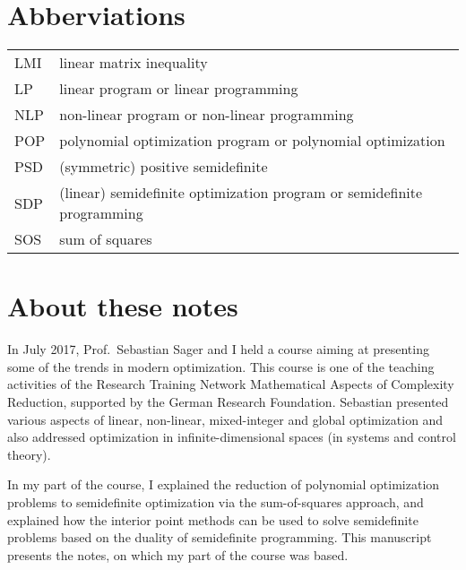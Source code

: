 \clearpage 

\section*{Abberviations}

\begin{tabular}{ll}
	LMI & linear matrix inequality 
	\\ LP & linear program or linear programming 
	\\ NLP & non-linear program or non-linear programming 
	\\ POP & polynomial optimization program or polynomial optimization
	\\ PSD & (symmetric) positive semidefinite
	\\ SDP & (linear) semidefinite optimization program or semidefinite programming
	\\ SOS & sum of squares
\end{tabular}

\clearpage 

\section*{About these notes} 

In July 2017, Prof.~Sebastian Sager and I held a course aiming at presenting some of the trends in modern optimization. This course is one of the teaching activities of the Research Training Network Mathematical Aspects of Complexity Reduction, supported by the German Research Foundation. Sebastian presented various aspects of linear, non-linear, mixed-integer and global optimization and also addressed optimization in infinite-dimensional spaces (in systems and control theory). 

In my part of the course, I explained the reduction of polynomial optimization problems to semidefinite optimization via the sum-of-squares approach, and explained how the interior point methods can be used to solve semidefinite problems based on the duality of semidefinite programming. This manuscript presents the notes, on which my part of the course was based.

